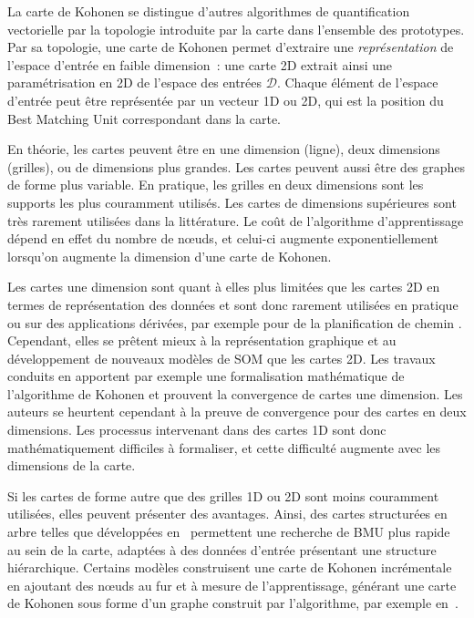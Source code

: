 \documentclass[../main]{subfiles}
\begin{document}
La carte de Kohonen se distingue d'autres algorithmes de quantification vectorielle par la topologie introduite par la carte dans l'ensemble des prototypes.
Par sa topologie, une carte de Kohonen permet d'extraire une \emph{représentation} de l'espace d'entrée en faible dimension~: une carte 2D extrait ainsi une paramétrisation en 2D de l'espace des entrées $\mathcal{D}$.
Chaque élément de l'espace d'entrée peut être représentée par un vecteur 1D ou 2D, qui est la position du Best Matching Unit correspondant dans la carte.

En théorie, les cartes peuvent être en une dimension (ligne), deux dimensions (grilles), ou de dimensions plus grandes. Les cartes peuvent aussi être des graphes de forme plus variable. 
En pratique, les grilles en deux dimensions sont les supports les plus couramment utilisés. Les cartes de dimensions supérieures sont très rarement utilisées dans la littérature. 
Le coût de l'algorithme d'apprentissage dépend en effet du nombre de n\oe{}uds, et celui-ci augmente exponentiellement lorsqu'on augmente la dimension d'une carte de Kohonen.

Les cartes une dimension sont quant à elles plus limitées que les cartes 2D en termes de représentation des données et sont donc rarement utilisées en pratique ou sur des applications dérivées, par exemple pour de la planification de chemin \parencite{FrezzaBuet2020SelforganizingMI}.
Cependant, elles se prêtent mieux à la représentation graphique et au développement de nouveaux modèles de SOM que les cartes 2D.
Les travaux conduits en \cite{Cottrell1998TheoreticalAO,fort_soms_2006} apportent par exemple une formalisation mathématique de l'algorithme de Kohonen et prouvent la convergence de cartes une dimension. Les auteurs se heurtent cependant à la preuve de convergence pour des cartes en deux dimensions. 
Les processus intervenant dans des cartes 1D sont donc mathématiquement difficiles à formaliser, et cette difficulté augmente avec les dimensions de la carte.

Si les cartes de forme autre que des grilles 1D ou 2D sont moins couramment utilisées, elles peuvent présenter des avantages. Ainsi, des cartes structurées en arbre telles que développées en~\cite{koikkalainen_self-organizing_1990} permettent une recherche de BMU plus rapide au sein de la carte, adaptées à des données d'entrée présentant une structure hiérarchique. Certains modèles construisent une carte de Kohonen incrémentale en ajoutant des n\oe{}uds au fur et à mesure de l'apprentissage, générant une carte de Kohonen sous forme d'un graphe construit par l'algorithme, par exemple en~\cite{Fritzke1995GrowingG, alahakoon_dynamic_2000, yamaguchi_adaptive_2010}.
\end{document}
